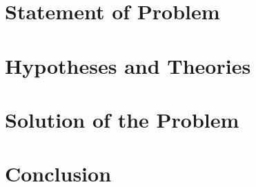 \section{Statement of Problem}

\section{Hypotheses and Theories}

\section{Solution of the Problem}

\section{Conclusion}